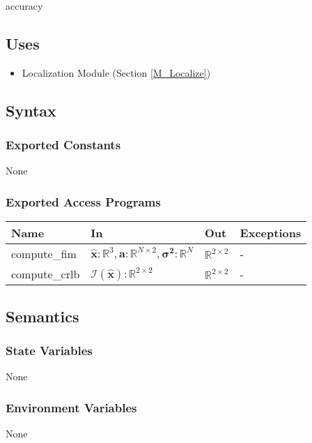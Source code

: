 \documentclass[12pt, titlepage]{article}
\begin{document}
accuracy

\subsection{Uses}
\begin{itemize}
  \item Localization Module (Section \ref{M_Localize})
\end{itemize}


\subsection{Syntax}

\subsubsection{Exported Constants}
None

\subsubsection{Exported Access Programs}

\begin{center}
\begin{tabular}{p{4cm} p{5cm} p{4cm} p{2cm}}
\hline
\textbf{Name} & \textbf{In} & \textbf{Out} & \textbf{Exceptions} \\
\hline
compute\_fim & $\hat{\mathbf{x}}: \mathbb{R}^3, \mathbf{a}: \mathbb{R}^{N \times 2}, \boldsymbol{\sigma^2}: \mathbb{R}^N$  & $\mathbb{R}^{2 \times 2}$ & - \\
compute\_crlb & $\boldsymbol{\mathcal{I}}(\hat{\mathbf{x}}): \mathbb{R}^{2 \times 2}$ & $\mathbb{R}^{2 \times 2}$ & - \\
\hline
\end{tabular}
\end{center}

\subsection{Semantics}

\subsubsection{State Variables}
None

\subsubsection{Environment Variables}
None
\end{document}
